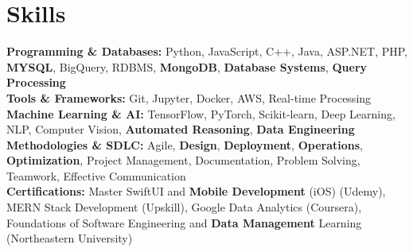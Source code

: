 \documentclass[a4paper,10pt]{article}
\begin{document}
\section*{Skills}
\textbf{Programming \& Databases: } Python, JavaScript, C++, Java, ASP.NET, PHP, \textbf{MYSQL}, BigQuery, RDBMS, \textbf{MongoDB}, \textbf{Database Systems}, \textbf{Query Processing} \\
\textbf{Tools \& Frameworks:} Git, Jupyter, Docker, AWS, Real-time Processing \\
\textbf{Machine Learning \& AI: } TensorFlow, PyTorch, Scikit-learn, Deep Learning, NLP, Computer Vision, \textbf{Automated Reasoning}, \textbf{Data Engineering} \\
\textbf{Methodologies \& SDLC:} Agile, \textbf{Design}, \textbf{Deployment}, \textbf{Operations}, \textbf{Optimization}, Project Management, Documentation, Problem Solving, Teamwork, Effective Communication \\
\textbf{Certifications:} Master SwiftUI and \textbf{Mobile Development} (iOS) (Udemy), MERN Stack Development (Upskill), Google Data Analytics (Coursera), Foundations of Software Engineering and \textbf{Data Management} Learning (Northeastern University) \\

\vspace{-4mm}
\end{document}
